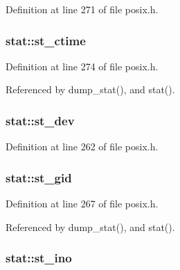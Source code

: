 Definition at line 271 of file posix.\-h.

\hypertarget{structstat_a1b4b858db1ebe79c3d6e0fc1ef721024}{
\subsubsection[{st\-\_\-ctime}]{ stat\-::st\-\_\-ctime}}\label{structstat_a1b4b858db1ebe79c3d6e0fc1ef721024}


Definition at line 274 of file posix.\-h.



Referenced by dump\-\_\-stat(), and stat().

\hypertarget{structstat_ac5b90090ae323741ae4c9e4f3683a29f}{
\subsubsection[{st\-\_\-dev}]{ stat\-::st\-\_\-dev}}\label{structstat_ac5b90090ae323741ae4c9e4f3683a29f}


Definition at line 262 of file posix.\-h.

\hypertarget{structstat_ab864f16f436cec370f0ced585d897698}{
\subsubsection[{st\-\_\-gid}]{ stat\-::st\-\_\-gid}}\label{structstat_ab864f16f436cec370f0ced585d897698}


Definition at line 267 of file posix.\-h.



Referenced by dump\-\_\-stat(), and stat().

\hypertarget{structstat_a9769ed8f0d4c5a9f329c32bc92479d56}{
\subsubsection[{st\-\_\-ino}]{ stat\-::st\-\_\-ino}}\label{structstat_a9769ed8f0d4c5a9f329c32bc92479d56}


